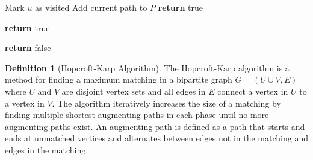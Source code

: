 \documentclass{article}
\theoremstyle{definition}
\newtheorem{definition}{Definition}
\begin{document}
\begin{algorithm}
\caption{DFS to Find Augmenting Path}
\begin{algorithmic}[1]
  \State Mark $u$ as visited 
   
    \State Add current path to $P$
    \State \textbf{return} true
  \EndIf
  
      \State \textbf{return} true
    \EndIf
  \EndFor
  
  \State \textbf{return} false
\EndProcedure
\end{algorithmic}
\end{algorithm}

\pagebreak
\newpage
\clearpage

\begin{definition}[Hopcroft-Karp Algorithm]
The Hopcroft-Karp algorithm is a method for finding a maximum matching in a bipartite graph $G = (U \cup V, E)$ where $U$ and $V$ are disjoint vertex sets and all edges in $E$ connect a vertex in $U$ to a vertex in $V$. The algorithm iteratively increases the size of a matching by finding multiple shortest augmenting paths in each phase until no more augmenting paths exist. An augmenting path is defined as a path that starts and ends at unmatched vertices and alternates between edges not in the matching and edges in the matching.

\end{definition}
\end{document}
